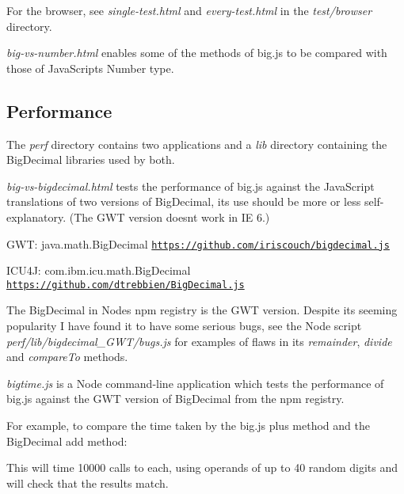 For the browser, see {\itshape single-\/test.\+html} and {\itshape every-\/test.\+html} in the {\itshape test/browser} directory.

{\itshape big-\/vs-\/number.\+html} enables some of the methods of big.\+js to be compared with those of Java\+Script\textquotesingle{}s Number type.

\subsection*{Performance}

The {\itshape perf} directory contains two applications and a {\itshape lib} directory containing the Big\+Decimal libraries used by both.

{\itshape big-\/vs-\/bigdecimal.\+html} tests the performance of big.\+js against the Java\+Script translations of two versions of Big\+Decimal, its use should be more or less self-\/explanatory. (The G\+WT version doesn\textquotesingle{}t work in IE 6.)


\begin{DoxyItemize}
\item G\+WT\+: java.\+math.\+Big\+Decimal \href{https://github.com/iriscouch/bigdecimal.js}{\tt https\+://github.\+com/iriscouch/bigdecimal.\+js}
\item I\+C\+U4J\+: com.\+ibm.\+icu.\+math.\+Big\+Decimal \href{https://github.com/dtrebbien/BigDecimal.js}{\tt https\+://github.\+com/dtrebbien/\+Big\+Decimal.\+js}
\end{DoxyItemize}

The Big\+Decimal in Node\textquotesingle{}s npm registry is the G\+WT version. Despite its seeming popularity I have found it to have some serious bugs, see the Node script {\itshape perf/lib/bigdecimal\+\_\+\+G\+W\+T/bugs.\+js} for examples of flaws in its {\itshape remainder}, {\itshape divide} and {\itshape compare\+To} methods.

{\itshape bigtime.\+js} is a Node command-\/line application which tests the performance of big.\+js against the G\+WT version of Big\+Decimal from the npm registry.

For example, to compare the time taken by the big.\+js {\ttfamily plus} method and the Big\+Decimal {\ttfamily add} method\+: 


This will time 10000 calls to each, using operands of up to 40 random digits and will check that the results match.

